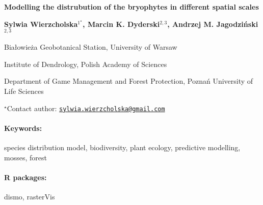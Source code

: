 \documentclass[11pt, a4paper]{article}
\renewcommand{\title}[1]{\begin{center}{\bf \LARGE #1}\end{center}}
\newcommand{\keywords}{\paragraph{Keywords:}}
\newcommand{\packages}{\paragraph{R packages:}}
\begin{document}
\pagestyle{empty}

\title{Modelling the distrubution of the bryophytes in different spatial scales}

\begin{center}
  {\bf Sylwia Wierzcholska$^{1^\star}$, Marcin K. Dyderski$^{2, 3}$, Andrzej M. Jagodziński$^{2, 3}$}
\end{center}

\vskip 0.3cm

\begin{affiliations}
\begin{enumerate}
\begin{minipage}{0.915\textwidth}
\centering
\item Białowieża Geobotanical Station, University of Warsaw \\[-2pt]
\item Institute of Dendrology, Polish Academy of Sciences \\[-2pt]
\item Department of Game Management and Forest Protection, Poznań University
of Life Sciences \\[-2pt]
\end{minipage}
\end{enumerate}
$^\star$Contact author: \href{mailto:sylwia.wierzcholska@gmail.com}{\nolinkurl{sylwia.wierzcholska@gmail.com}}\\
\end{affiliations}

\vskip 0.5cm

\begin{minipage}{0.915\textwidth}
\keywords species distribution model, biodiversity, plant ecology, predictive
modelling, mosses, forest
\packages dismo, rasterVis
\end{minipage}

\vskip 0.8cm
\end{document}
